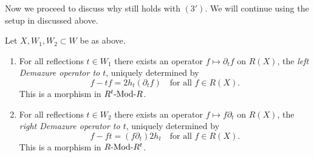 Now we proceed to discuss why \cite[Definition/Proposition 5.0.1]{WillSingular} still holds with $\hyperref[assumption 3']{(3')}$. We will continue using the setup in \cite[Definition/Proposition 4.3.2]{WillSingular} discussed above.
\begin{prop*}\cite[Definition/Proposition 5.0.1]{WillSingular}
Let $X, W_1, W_2 \subset W$ be as above.

\begin{enumerate}
\item For all reflections $t \in W_1$ there exists an operator
$f \mapsto \partial_tf$ on $R(X)$, the \emph{left Demazure operator to $t$}, uniquely determined by
\begin{equation*}
  f - tf = 2h_t(\partial_tf) \quad \text{for all $f \in R(X)$.}
\end{equation*}
This is a morphism in $\text{${R^t}$-Mod-${R}$}$.

\item For all reflections $t \in W_2$ there exists an operator $f \mapsto f\partial_t$ on $R(X)$, the \emph{right Demazure operator to $t$}, uniquely determined by
\begin{equation*}
  f - ft = (f \partial_t)2h_t \quad \text{for all $f \in R(X)$.}
\end{equation*}
This is a morphism in $\text{${R}$-Mod-${R^t}$}$.
\end{enumerate}
\end{prop*}

